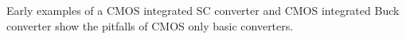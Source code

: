 \documentclass[letterpaper,twocolumn,10pt]{article}
\begin{document}
% 
%
%

Early examples of a CMOS integrated SC converter \cite{Viraj2007} and CMOS integrated Buck converter \cite{Alimadadi2008} show the pitfalls of CMOS only basic converters.\\ %
\end{document}
